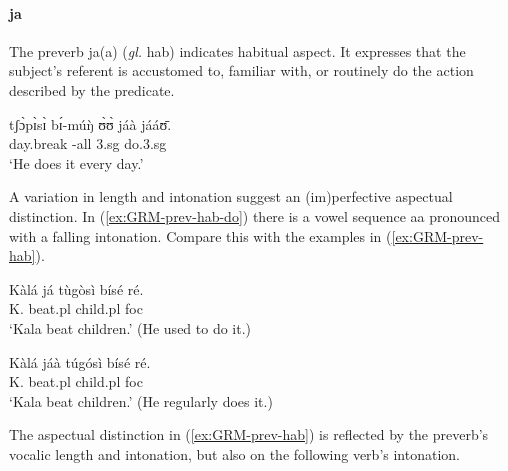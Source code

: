 \begin{exe}
\begin{exe}
\begin{exe}
{\begin{exe}
\begin{exe}
\begin{exe}
\begin{exe}
\begin{exe}
\begin{exe}
\begin{exe}
\begin{exe}
\begin{exe}
\begin{exe}
\begin{exe}
\begin{exe}
\begin{exe}
\begin{exe}
\begin{exe}
\begin{exe}
\begin{exe}
\begin{exe}
\begin{exe}
\begin{exe}
\begin{exe}



\paragraph{ja}
\label{sec:GRM-preverb-hab}

The preverb {\sls ja(a)} ({\it gl.} {\sc hab})  indicates habitual aspect. It 
expresses that the subject's referent is accustomed to, familiar with, or 
routinely do the action described by the predicate.


\ea\label{ex:GRM-prev-hab-do}
\gll tʃɔ̀pɪ̀sɪ̀ bɪ́-múŋ̀ ʊ̀ʊ̀ jáà jááʊ̄.\\
 day.break {\itr}-all {\sc 3.sg} {\hab} do.{\sc 3.sg}\\
\glt `He does it every day.'
\z 

 A variation in  length and intonation suggest  an (im)perfective aspectual 
distinction. In   (\ref{ex:GRM-prev-hab-do})  there is a  vowel sequence {\sls 
aa} pronounced with a falling intonation. Compare this with the examples in 
(\ref{ex:GRM-prev-hab}). 



 

\ea\label{ex:GRM-prev-hab}
\ea\label{ex:GRM-prev-hab-do-pfv}
\gll  Kàlá já tùgòsì bísé ré.\\
 K.  {\hab}  beat.{\sc pl} child.{\sc pl} {\sc foc}\\
\glt `Kala beat children.' (He used to do it.)

\ex\label{ex:GRM-prev-hab-impv}
\gll  Kàlá jáà túgósì bísé ré.\\
K.  {\hab}  beat.{\sc pl} child.{\sc pl} {\sc foc}\\
\glt `Kala beat children.' (He regularly does it.)

\z 
 \z

The aspectual distinction in (\ref{ex:GRM-prev-hab}) is reflected by the 
preverb's vocalic length and intonation, but also on the following verb's 
intonation.





\end{exe}
\end{exe}
\end{exe}
\end{exe}
\end{exe}
\end{exe}
\end{exe}
\end{exe}
\end{exe}
\end{exe}
\end{exe}
\end{exe}
\end{exe}
\end{exe}
\end{exe}
\end{exe}
\end{exe}
\end{exe}
\end{exe}
\end{exe}
\end{exe}}
\end{exe}
\end{exe}
\end{exe}
